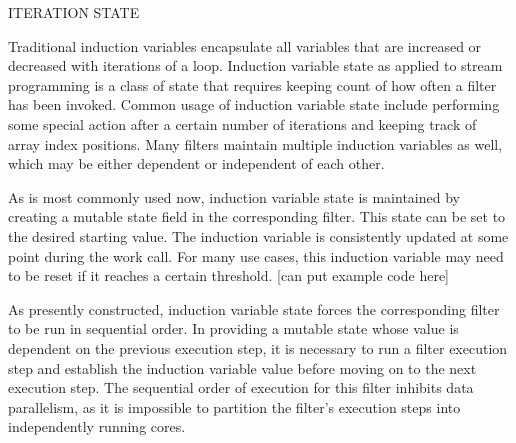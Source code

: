 {\large ITERATION STATE}

Traditional induction variables encapsulate all variables that are increased or decreased with iterations of a loop.  Induction variable state as applied to stream programming is a class of state that requires keeping count of how often a filter has been invoked.  Common usage of induction variable state include performing some special action after a certain number of iterations and keeping track of array index positions.  Many filters maintain multiple induction variables as well, which may be either dependent or independent of each other.

As is most commonly used now, induction variable state is maintained by creating a mutable state field in the corresponding filter.  This state can be set to the desired starting value.  The induction variable is consistently updated at some point during the work call.  For many use cases, this induction variable may need to be reset if it reaches a certain threshold. [can put example code here] 

As presently constructed, induction variable state forces the corresponding filter to be run in sequential order.  In providing a mutable state whose value is dependent on the previous execution step, it is necessary to run a filter execution step and establish the induction variable value before moving on to the next execution step.  The sequential order of execution for this filter inhibits data parallelism, as it is impossible to partition the filter's execution steps into independently running cores.


